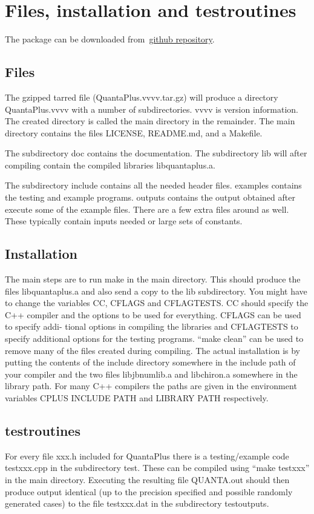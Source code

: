 \documentclass[a4paper,12pt]{article}
\begin{document}
\section*{Files, installation and testroutines}
The package can be downloaded from~\href{https://github.com/Moh-Maher}{github repository}.  
\subsection*{Files}
The gzipped tarred file (QuantaPlus.vvvv.tar.gz) will produce a directory QuantaPlus.vvvv with
a number of subdirectories. vvvv is version information. The created directory is called
the main directory in the remainder.
The main directory contains the files LICENSE, README.md, and a Makefile.

The subdirectory doc contains the documentation.
The subdirectory lib will after compiling contain the compiled libraries libquantaplus.a.

The subdirectory include contains all the needed header files. examples contains the testing and example programs. outputs contains the output obtained after execute some of the example files.
There are a few extra files around as well. These typically contain inputs needed or large
sets of constants.


\subsection*{Installation}

The main steps are to run make in the main directory. This should produce the files
libquantaplus.a and also send a copy to the lib subdirectory. You might
have to change the variables CC, CFLAGS and CFLAGTESTS. CC should specify the C++
compiler and the options to be used for everything. CFLAGS can be used to specify addi-
tional options in compiling the libraries and CFLAGTESTS to specify additional options for
the testing programs.
“make clean” can be used to remove many of the files created during compiling.
The actual installation is by putting the contents of the include directory somewhere
in the include path of your compiler and the two files libjbnumlib.a and libchiron.a
somewhere in the library path. For many C++ compilers the paths are given in the
environment variables CPLUS INCLUDE PATH and LIBRARY PATH respectively.
\subsection*{testroutines}

For every file xxx.h included for QuantaPlus there is a testing/example code
testxxx.cpp in the subdirectory test. These can be compiled using “make testxxx” in the
main directory. Executing the resulting file QUANTA.out should then produce output identical (up
to the precision specified and possible randomly generated cases) to the file testxxx.dat
in the subdirectory testoutputs.
  
\end{document}
